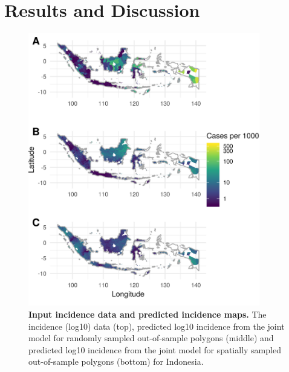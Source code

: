 \documentclass[10pt,letterpaper]{article}
\begin{document}
\section*{Results and Discussion}





\begin{figure}[!h]
\includegraphics[width = 0.9\textwidth]{figures/idn_both_cv12_preds.png}
\caption{{\bf Input incidence data and predicted incidence maps. } 
The incidence (log10) data (top), predicted log10 incidence from the joint model for randomly sampled out-of-sample polygons (middle) and predicted log10 incidence from the joint model for spatially sampled out-of-sample polygons (bottom) for Indonesia.
}
\label{predobsmapidn}
\end{figure}
\end{document}
